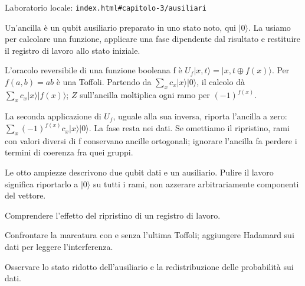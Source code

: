{\sffamily\small\color{Ink!70} Laboratorio locale: \nolinkurl{index.html#capitolo-3/ausiliari}\par}

Un'ancilla è un qubit ausiliario preparato in uno stato noto, qui \(|0\rangle \). La usiamo per calcolare una funzione, applicare una fase dipendente dal risultato e restituire il registro di lavoro allo stato iniziale.\par

L'oracolo reversibile di una funzione booleana f è \(U_{f}|x,\allowbreak t\rangle =|x,\allowbreak t\oplus f(x)\rangle \). Per \(f(a,\allowbreak b)=ab\) è una Toffoli. Partendo da \(\sum _{x}c_{x}|x\rangle |0\rangle \), il calcolo dà \(\sum _{x}c_{x}|x\rangle |f(x)\rangle \); \(Z\) sull'ancilla moltiplica ogni ramo per \((- 1)^{f(x)}\).\par

La seconda applicazione di \(U_{f}\), uguale alla sua inversa, riporta l'ancilla a zero: \(\sum _{x}(- 1)^{f(x)}c_{x}|x\rangle |0\rangle \). La fase resta nei dati. Se omettiamo il ripristino, rami con valori diversi di f conservano ancille ortogonali; ignorare l'ancilla fa perdere i termini di coerenza fra quei gruppi.\par



Le otto ampiezze descrivono due qubit dati e un ausiliario. Pulire il lavoro significa riportarlo a \(|0\rangle \) su tutti i rami, non azzerare arbitrariamente componenti del vettore.\par



Comprendere l'effetto del ripristino di un registro di lavoro.\par

Confrontare la marcatura con e senza l'ultima Toffoli; aggiungere Hadamard sui dati per leggere l'interferenza.\par

Osservare lo stato ridotto dell'ausiliario e la redistribuzione delle probabilità sui dati.\par


